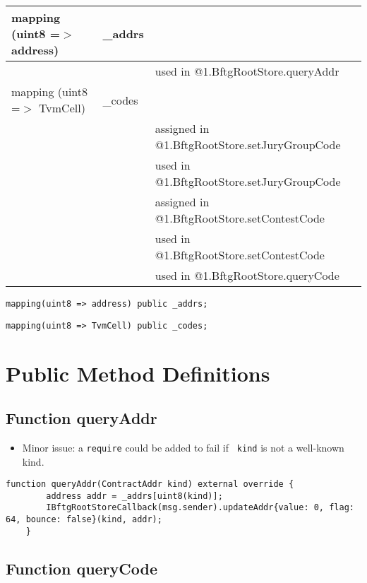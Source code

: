 \ifsoltables
\noindent\begin{tabular}{|l|l|p{5cm}|}\hline
mapping (uint8 =$>$ address) & \_{}addrs &  \\\hline
 & & used in @1.BftgRootStore.queryAddr\\\hline
mapping (uint8 =$>$ TvmCell) & \_{}codes &  \\\hline
 & & assigned in @1.BftgRootStore.setJuryGroupCode\\\hline
 & & used in @1.BftgRootStore.setJuryGroupCode\\\hline
 & & assigned in @1.BftgRootStore.setContestCode\\\hline
 & & used in @1.BftgRootStore.setContestCode\\\hline
 & & used in @1.BftgRootStore.queryCode\\\hline
\end{tabular}
\fi


\begin{lstlisting}[firstnumber=10]
    mapping(uint8 => address) public _addrs;
\end{lstlisting}

\begin{lstlisting}[firstnumber=11]
    mapping(uint8 => TvmCell) public _codes;
\end{lstlisting}

\section{Public Method Definitions}


\subsection{Function queryAddr}

\begin{itemize}
\item Minor issue: a {\tt require} could be added to fail if {\tt
  kind} is not a well-known kind.
\end{itemize}

\begin{lstlisting}[firstnumber=26]
    function queryAddr(ContractAddr kind) external override {
        address addr = _addrs[uint8(kind)];
        IBftgRootStoreCallback(msg.sender).updateAddr{value: 0, flag: 64, bounce: false}(kind, addr);
    }
\end{lstlisting}

\subsection{Function queryCode}

